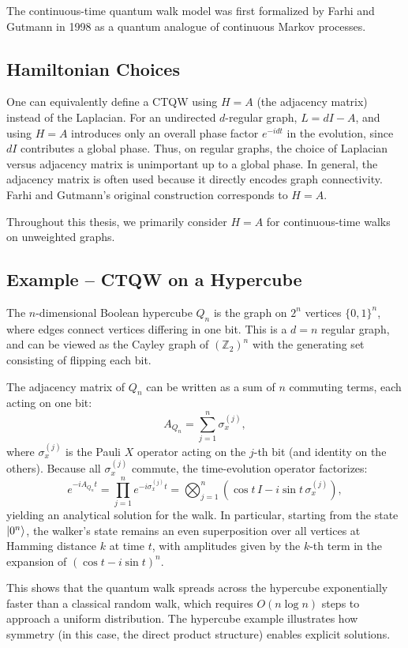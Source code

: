\documentclass[12pt]{report}
\begin{document}
The continuous-time quantum walk model was first formalized by Farhi and Gutmann in 1998 as a quantum analogue of continuous Markov processes.

\subsection{Hamiltonian Choices}

One can equivalently define a CTQW using $H = A$ (the adjacency matrix) instead of the Laplacian. For an undirected $d$-regular graph, $L = dI - A$, and using $H=A$ introduces only an overall phase factor $e^{-i d t}$ in the evolution, since $dI$ contributes a global phase. Thus, on regular graphs, the choice of Laplacian versus adjacency matrix is unimportant up to a global phase. In general, the adjacency matrix is often used because it directly encodes graph connectivity. Farhi and Gutmann’s original construction corresponds to $H=A$.

Throughout this thesis, we primarily consider $H = A$ for continuous-time walks on unweighted graphs.

\subsection{Example – CTQW on a Hypercube}

The $n$-dimensional Boolean hypercube $Q_n$ is the graph on $2^n$ vertices $\{0,1\}^n$, where edges connect vertices differing in one bit. This is a $d = n$ regular graph, and can be viewed as the Cayley graph of $(\mathbb{Z}_2)^n$ with the generating set consisting of flipping each bit.

The adjacency matrix of $Q_n$ can be written as a sum of $n$ commuting terms, each acting on one bit:
\[
A_{Q_n} = \sum_{j=1}^{n} \sigma_x^{(j)},
\]
where $\sigma_x^{(j)}$ is the Pauli $X$ operator acting on the $j$-th bit (and identity on the others). Because all $\sigma_x^{(j)}$ commute, the time-evolution operator factorizes:
\[
e^{-i A_{Q_n} t} = \prod_{j=1}^{n} e^{-i \sigma_x^{(j)} t} = \bigotimes_{j=1}^{n} \left( \cos t \, I - i \sin t \, \sigma_x^{(j)} \right),
\]
yielding an analytical solution for the walk. In particular, starting from the state $\ket{0^n}$, the walker's state remains an even superposition over all vertices at Hamming distance $k$ at time $t$, with amplitudes given by the $k$-th term in the expansion of $(\cos t - i \sin t)^n$.

This shows that the quantum walk spreads across the hypercube exponentially faster than a classical random walk, which requires $O(n \log n)$ steps to approach a uniform distribution. The hypercube example illustrates how symmetry (in this case, the direct product structure) enables explicit solutions.
\end{document}
